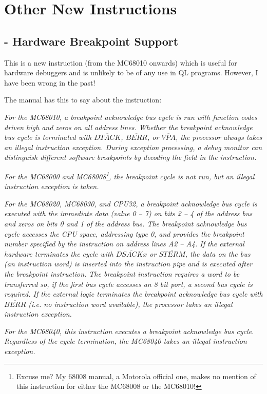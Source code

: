 \section{Other New Instructions}

\subsection{ - Hardware Breakpoint Support}

This is a new instruction (from the MC68010 onwards) which is useful for hardware debuggers and is unlikely to be of any use in QL programs. However, I have been wrong in the past!

The manual has this to say about the instruction:

\emph{For the MC68010, a breakpoint acknowledge bus cycle is run with function codes driven high and zeros on all address lines. Whether the breakpoint acknowledge bus cycle is terminated with $\overline{DTACK}$, $\overline{BERR}$, or $\overline{VPA}$, the processor always takes an illegal instruction exception. During exception processing, a debug monitor can distinguish different software breakpoints by decoding the field in the  instruction.}

\emph{For the MC68000 and MC68008\footnote{Excuse me? My 68008 manual, a Motorola official one, makes no mention of this instruction for either the MC68008 or the MC68010!}, the breakpoint cycle is not run, but an illegal instruction exception is taken.}

\emph{For the MC68020, MC68030, and CPU32, a breakpoint acknowledge bus cycle is executed with the immediate data (value 0 – 7) on bits 2 – 4 of the address bus and zeros on bits 0 and 1 of the address bus. The breakpoint acknowledge bus cycle accesses the CPU space, addressing type 0, and provides the breakpoint number specified by the instruction on address lines A2 – A4. If the external hardware terminates the cycle
with $\overline{DSACKx}$ or $\overline{STERM}$, the data on the bus (an instruction word) is inserted into the instruction pipe and is executed after the breakpoint instruction. The breakpoint instruction requires a word to be transferred so, if the first bus cycle accesses an 8 bit port,
a second bus cycle is required. If the external logic terminates the breakpoint acknowledge bus cycle with $\overline{BERR}$ (i.e. no instruction word available), the processor takes an illegal instruction exception.}

\emph{For the MC68040, this instruction executes a breakpoint acknowledge bus cycle. Regardless of the cycle termination, the MC68040 takes an illegal instruction exception.}

